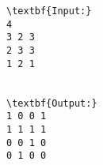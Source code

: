 \begin{verbatim}
\textbf{Input:}
4
3 2 3
2 3 3
1 2 1


\textbf{Output:}
1 0 0 1
1 1 1 1
0 0 1 0
0 1 0 0
\end{verbatim}